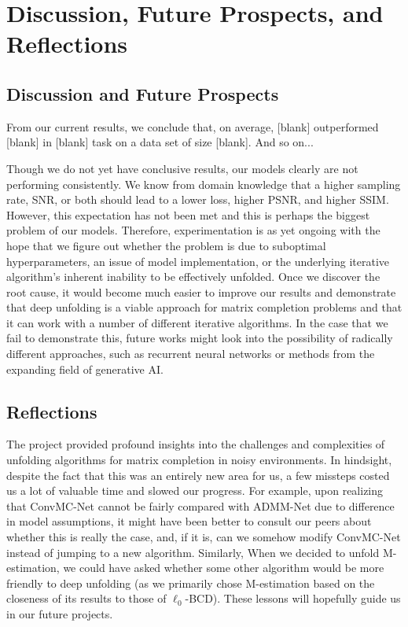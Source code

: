 
\chapter{Discussion, Future Prospects, and Reflections} %
\label{Chapter5}
\lhead{} %

\section{Discussion and Future Prospects} %
From our current results, we conclude that, on average, [blank] outperformed [blank] in [blank] task on a data set of size [blank]. And so on...

Though we do not yet have conclusive results, our models clearly are not performing consistently. We know from domain knowledge that a higher sampling rate, SNR, or both should lead to a lower loss, higher PSNR, and higher SSIM. However, this expectation has not been met and this is perhaps the biggest problem of our models. Therefore, experimentation is as yet ongoing with the hope that we figure out whether the problem is due to suboptimal hyperparameters, an issue of model implementation, or the underlying iterative algorithm's inherent inability to be effectively unfolded. Once we discover the root cause, it would become much easier to improve our results and demonstrate that deep unfolding is a viable approach for matrix completion problems and that it can work with a number of different iterative algorithms. In the case that we fail to demonstrate this, future works might look into the possibility of radically different approaches, such as recurrent neural networks or methods from the expanding field of generative AI.

\section{Reflections}
The project provided profound insights into the challenges and complexities of unfolding algorithms for matrix completion in noisy environments. In hindsight, despite the fact that this was an entirely new area for us, a few missteps costed us a lot of valuable time and slowed our progress. For example, upon realizing that ConvMC-Net cannot be fairly compared with ADMM-Net due to difference in model assumptions, it might have been better to consult our peers about whether this is really the case, and, if it is, can we somehow modify ConvMC-Net instead of jumping to a new algorithm. Similarly, When we decided to unfold M-estimation, we could have asked whether some other algorithm would be more friendly to deep unfolding (as we primarily chose M-estimation based on the closeness of its results to those of $\ell_0$-BCD). These lessons will hopefully guide us in our future projects.